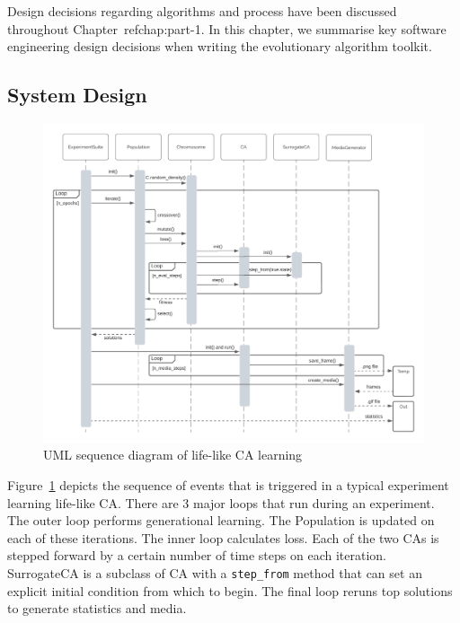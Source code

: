 Design decisions regarding algorithms and process have been discussed throughout Chapter~ref{chap:part-1}. In this chapter, we summarise key software engineering design decisions when writing the evolutionary algorithm toolkit.

\subsection{System Design}
\begin{figure}[!h]
\centering
    \includegraphics[width=\textwidth]{images/uml_seq.png}
    \caption{UML sequence diagram of life-like CA learning}
\label{fig:uml-seq}
\end{figure}

Figure~\ref{fig:uml-seq} depicts the sequence of events that is triggered in a typical experiment learning life-like CA. There are 3 major loops that run during an experiment. The outer loop performs generational learning. The Population is updated on each of these iterations. The inner loop calculates loss. Each of the two CAs is stepped forward by a certain number of time steps on each iteration. SurrogateCA is a subclass of CA with a \texttt{step\_from} method that can set an explicit initial condition from which to begin. The final loop reruns top solutions to generate statistics and media.

